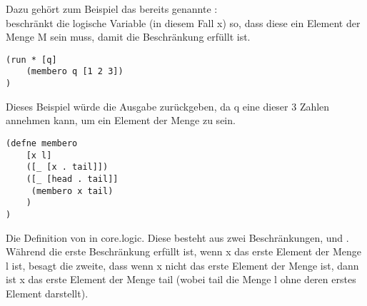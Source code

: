 Dazu gehört zum Beispiel das bereits genannte :\\
 beschränkt die logische Variable (in diesem Fall x) so, dass diese ein Element der Menge M sein muss, damit die Beschränkung erfüllt ist.\\
\begin{lstlisting}
(run * [q]
	(membero q [1 2 3])
)
\end{lstlisting}
Dieses Beispiel würde die Ausgabe  zurückgeben, da q eine dieser 3 Zahlen annehmen kann, um ein Element der Menge \code{[1 2 3]} zu sein.

\begin{lstlisting}
(defne membero
	[x l]
	([_ [x . tail]])
	([_ [head . tail]]
	 (membero x tail)
	)
)
\end{lstlisting}
Die Definition von  in core.logic. Diese besteht aus zwei Beschränkungen, \code{([\_ [x . tail]])} und . Während die erste Beschränkung erfüllt ist, wenn x das erste Element der Menge l ist, besagt die zweite, dass wenn x nicht das erste Element der Menge ist, dann ist x das erste Element der Menge tail (wobei tail die Menge l ohne deren erstes Element darstellt).

